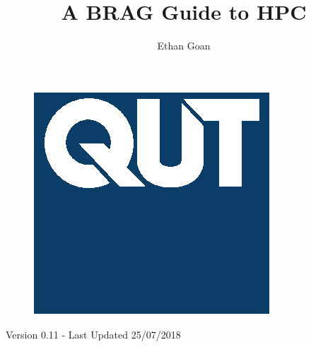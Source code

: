 \documentclass[oneside]{article}
\begin{document}
 
%
\pagestyle{main}
%
%
%
\title{A BRAG Guide to HPC}
\date{}
\author{Ethan Goan}
\maketitle
\begin{figure}[!h]
  \centering
  \includegraphics[scale=0.5]{./figs/qut.eps}
\end{figure}
\begin{center}
  Version 0.11 - Last Updated 25/07/2018
\end{center}
\tableofcontents
%
\newpage
%

%
\newpage

%
%

%
%

%
\newpage

\newpage
%

%
\newpage
\printbibliography
%
%
\newpage
%
%

\end{document}
